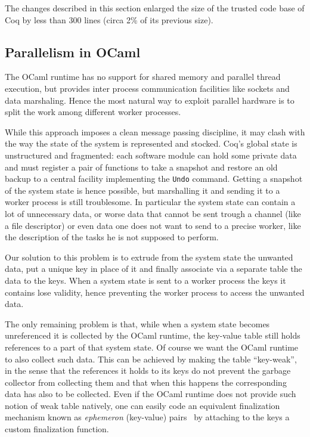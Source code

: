 \documentclass[runningheads,a4paper,oribibl]{llncs}
\newcommand{\tmverbatim}[1]{\lstinline|#1|}
\begin{document}
The changes described in this section
enlarged the size of the trusted code base of Coq
by less than 300 lines (circa 2\% of its previous size).

\subsection{Parallelism in OCaml}

The OCaml runtime has no support
for shared memory and parallel thread execution, but provides
inter process communication facilities like sockets and data
marshaling.
Hence the most natural way to exploit parallel hardware is to split
the work among different worker processes.

While this approach imposes a clean message passing discipline, it may
clash with the way the state of the system is represented and stocked.
Coq's
global state is unstructured and fragmented: each software
module can hold some private
data and must register a pair of functions to take a snapshot and restore an
old backup to a central facility implementing the \tmverbatim{Undo}
command.
Getting a snapshot of the system state is hence possible, but marshalling it
and sending it to a worker process is still troublesome. In particular the
system state can contain a lot of unnecessary data, or worse data that
cannot be sent trough a channel (like a file descriptor) or even data one does
not want to send to a precise worker, like the description of the tasks he is
not supposed to perform.

Our solution to this problem is to extrude from the system state the unwanted
data, put a unique key in place of it and finally associate via a separate
table the data to the keys. When a
system state is sent to a worker process the keys it contains lose validity,
hence preventing the worker process to access the unwanted data.

The only remaining problem is that, while when a system state becomes
unreferenced it is collected by the OCaml runtime, the key-value table still
holds references to a part of that system state. Of course we want the
OCaml runtime to also collect such data. This can be achieved by making the
table ``key-weak'', in the sense that the references it holds to its keys do
not prevent the garbage collector from collecting them and that when this
happens the corresponding data has also to be collected. Even if the OCaml
runtime does not provide such notion of weak table natively, one can easily
code an equivalent finalization mechanism
known as \emph{ephemeron}
(key-value) pairs~\cite{Hayes:1997:ENF:263698.263733} 
by attaching to the keys a custom finalization function.
\end{document}
